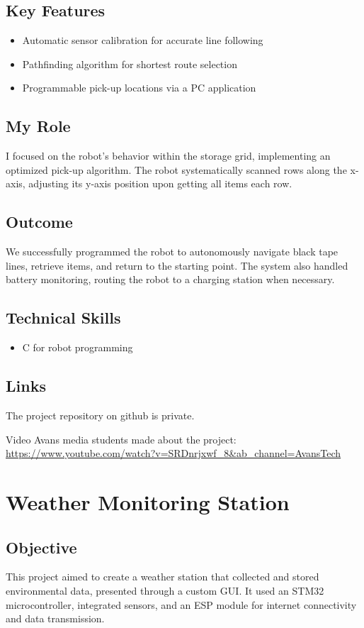 \documentclass{article}
\begin{document}
\subsection{Key Features}
\begin{itemize}
    \item Automatic sensor calibration for accurate line following
    \item Pathfinding algorithm for shortest route selection
    \item Programmable pick-up locations via a PC application
\end{itemize}

\subsection{My Role}
I focused on the robot's behavior within the storage grid, implementing an optimized pick-up algorithm. 
The robot systematically scanned rows along the x-axis, 
adjusting its y-axis position upon getting all items each row. 


\subsection{Outcome}
We successfully programmed the robot to autonomously navigate black tape lines, retrieve items, and return to the starting point. The system also handled battery monitoring, routing the robot to a charging station when necessary.

\subsection{Technical Skills}
\begin{itemize}
    \item C for robot programming
\end{itemize}

\subsection{Links}
The project repository on github is private.

Video Avans media students made about the project:
\url{https://www.youtube.com/watch?v=SRDnrjxwf_8&ab_channel=AvansTech}

\section{Weather Monitoring Station}
\subsection{Objective}
This project aimed to create a weather station that collected and stored environmental data, presented through a custom GUI. It used an STM32 microcontroller, integrated sensors, and an ESP module for internet connectivity and data transmission.
\end{document}
